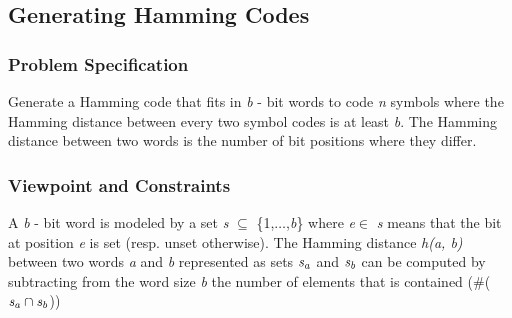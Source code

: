 \documentclass[a4paper]{scrartcl}
\begin{document}
\newpage
\subsection{Generating Hamming Codes}

\subsubsection{Problem Specification}
Generate a Hamming code that fits in {\it b} - bit words to 
code {\it n} symbols where the Hamming distance between every 
two symbol codes is at least {\it b}. The Hamming distance between 
two words is the number of bit positions where they differ. 

\subsubsection{Viewpoint and Constraints}
A {\it b} - bit word is modeled by a set 
{\it s} $\subseteq$ \{1,$\ldots$,{\it b}\}
where {\it e}$\in$ {\it s} means that the bit
at position {\it e} is set (resp. unset otherwise). The Hamming 
distance {\it h(a, b)} between two words {\it a} and {\it b}
represented as sets ${\it s_a}$  and ${\it s_b}$ 
can be computed by subtracting from the word size {\it b} 
the number of elements that is contained 
($\#$(${\it s_a} \cap {\it s_b}$)) 
\end{document}
